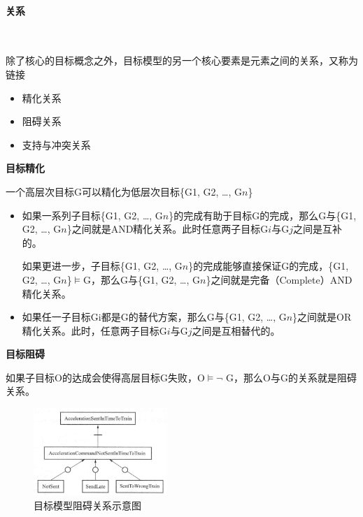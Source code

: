 \paragraph{关系}~{} \par
除了核心的目标概念之外，目标模型的另一个核心要素是元素之间的关系，又称为链接
\vspace{-0.8em}
	\begin{multicols}{3}
        \begin{itemize}
            \item 精化关系
            \item 阻碍关系
            \item 支持与冲突关系
        \end{itemize}        
	\end{multicols}
\vspace{-1em}

\textbf{目标精化} \par
一个高层次目标G可以精化为低层次目标\{G1, G2, …, G$n$\}
\begin{itemize}
    \item 如果一系列子目标\{G1, G2, …, G$n$\}的完成有助于目标G的完成，那么G与\{G1, G2, …, G$n$\}之间就是AND精化关系。此时任意两子目标G$i$与G$j$之间是互补的。
    
    如果更进一步，子目标\{G1, G2, …, G$n$\}的完成能够直接保证G的完成，\{G1, G2, …, G$n$\}$\vDash $G，那么G与\{G1, G2, …, G$n$\}之间就是完备（Complete）AND 精化关系。
    \item 如果任一子目标Gi都是G的替代方案，那么G与\{G1, G2, …, G$n$\}之间就是OR精化关系。此时，任意两子目标G$i$与G$j$之间是互相替代的。
\end{itemize}

\textbf{目标阻碍} \par
如果子目标O的达成会使得高层目标G失败，O$\vDash \lnot$ G，那么O与G的关系就是阻碍关系。
\begin{figure}[H]
	\centering
	\includegraphics[width=0.45\textwidth]{img/目标模型阻碍关系示意图.png}
    \caption*{目标模型阻碍关系示意图}
\end{figure}
\vspace{-1em}

